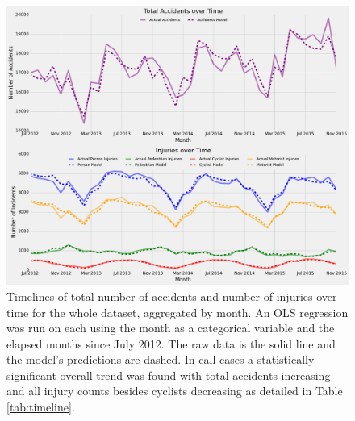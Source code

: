 \documentclass[10pt,journal,compsoc]{IEEEtran}
\begin{document}
\begin{figure}[h]
	\centering
	\includegraphics[width=\textwidth]{fig1.png}
	\caption{Timelines of total number of accidents and number of injuries over time for the whole dataset, aggregated by month.  An OLS regression was run on each using the month as a categorical variable and the elapsed months since July 2012.  The raw data is the solid line and the model's predictions are dashed.  In call cases a statistically significant overall trend was found with total accidents increasing and all injury counts besides cyclists decreasing as detailed in Table \ref{tab:timeline}.}\label{fig:timeline}
\end{figure}
\end{document}
